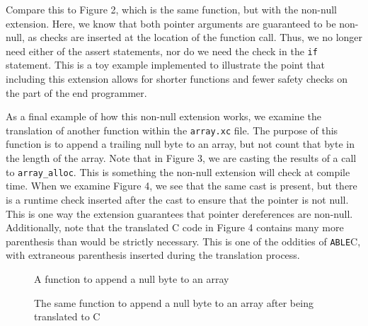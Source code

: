 \documentclass[main.tex]{subfiles}
\begin{document}
Compare this to Figure 2, which is the same function, but with the non-null extension. Here, we know that both pointer
arguments are guaranteed to be non-null, as checks are inserted at the location of the function call. Thus, we no longer 
need either of the assert statements, nor do we need the check in
the \verb|if| statement. This is a toy example implemented to illustrate the point that including this extension allows for shorter 
functions and fewer safety checks on the part of the end programmer.

As a final example of how this non-null extension works, we examine the translation of another function within the \verb|array.xc|
file. The purpose of this function is to append a trailing null byte to an array, but not count that byte in the length of the array.
Note that in Figure 3, we are casting the results of a call to \verb|array_alloc|. This is something the non-null extension will check
at compile time. When we examine Figure 4, we see that the same cast is present, but there is a runtime check inserted after
the cast to ensure that the pointer is not null. This is one way the extension guarantees that pointer dereferences are non-null.
Additionally, note that the translated C code in Figure 4 contains many more parenthesis than would be strictly necessary.
This is one of the oddities of \verb|ABLE|C, with extraneous parenthesis inserted during the translation process.
\begin{figure}[p]

\caption{A function to append a null byte to an array}
\end{figure}
\begin{figure}[p]

\caption{The same function to append a null byte to an array after being translated to C}
\end{figure}
\end{document}
